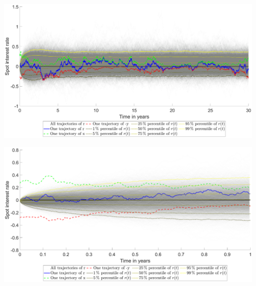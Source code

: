 \begin{landscape}
\includegraphics[width=.95\columnwidth]{Rates/R_A_1}
\end{landscape}
\begin{landscape}
\includegraphics[width=.95\columnwidth]{Rates/R_A_2}
\end{landscape}
